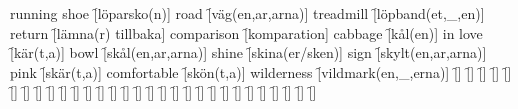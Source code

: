 \begin{questions}
\begin{multicols}{2}
        \question running shoe \f[löparsko(n)]
        \question road \f[väg(en,ar,arna)]
        \question treadmill \f[löpband(et,\_,en)]
        \question return \f[lämna(r) tillbaka]
        \question comparison \f[komparation]
        \question cabbage \f[kål(en)]
        \question in love \f[kär(t,a)]
        \question bowl \f[skål(en,ar,arna)]
        \question shine \f[skina(er/sken)]
        \question sign \f[skylt(en,ar,arna)]
        \question pink \f[skär(t,a)]
        \question comfortable \f[skön(t,a)]
        \question wilderness \f[vildmark(en,\_,erna)]
        \question  \f[]
        \question  \f[]
        \question  \f[]
        \question  \f[]
        \question  \f[]
        \question  \f[]
        \question  \f[]
        \question  \f[]
        \question  \f[]
        \question  \f[]
        \question  \f[]
        \question  \f[]
        \question  \f[]
        \question  \f[]
        \question  \f[]
        \question  \f[]
        \question  \f[]
        \question  \f[]
        \question  \f[]
        \question  \f[]
        \question  \f[]
        \question  \f[]
        \question  \f[]
        \question  \f[]
        \question  \f[]
        \question  \f[]
        \question  \f[]
        \question  \f[]
        \question  \f[]
        \question  \f[]
    \end{multicols}
\end{questions}
